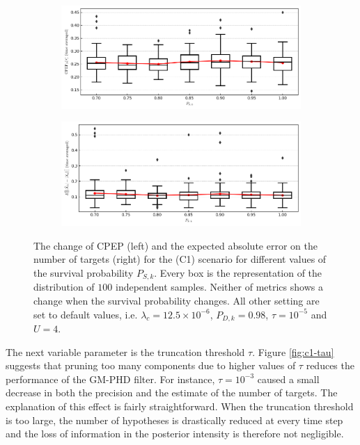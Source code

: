 \begin{figure}
    \centering
    \begin{subfigure}[]{0.48\linewidth}
        \centering
        \includegraphics[width=\linewidth]{figures/c1-ps-cpep.png}
    \end{subfigure}
    \hfill
    \begin{subfigure}[]{0.48\linewidth}
        \centering
        \includegraphics[width=\linewidth]{figures/c1-ps-eae.png}
    \end{subfigure}
  \caption[(C1). Change of performance depending on the survival probability.]{The change of CPEP (left) and the expected absolute error on the number of targets (right) for the (C1) scenario for different values of the survival probability $P_{S,k}$. Every box is the representation of the distribution of $100$ independent samples. Neither of metrics shows a change when the survival probability changes. All other setting are set to default values, i.e. $\lambda_{c} = 12.5 \times 10^{-6}$, $P_{D,k} = 0.98$, $\tau = 10^{-5}$ and $U = 4$.}
  \label{fig:c1-ps}
\end{figure}

The next variable parameter is the truncation threshold $\tau$. Figure \ref{fig:c1-tau} suggests that pruning too many components due to higher values of $\tau$ reduces the performance of the GM-PHD filter. For instance, $\tau = 10^{-3}$ caused a small decrease in both the precision and the estimate of the number of targets. The explanation of this effect is fairly straightforward. When the truncation threshold is too large, the number of hypotheses is drastically reduced at every time step and the loss of information in the posterior intensity is therefore not negligible.

